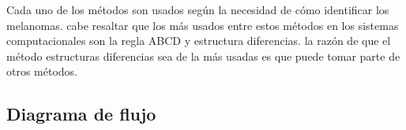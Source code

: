 \documentclass[a4paper]{article}
\begin{document}
Cada uno de los métodos son usados según la necesidad de cómo identificar los melanomas. cabe resaltar que los más usados entre estos métodos en los sistemas computacionales son la regla ABCD y estructura diferencias. la razón de que el método estructuras diferencias sea de la más usadas es que puede tomar parte de otros métodos.



\subsection{Diagrama de flujo}
\end{document}
